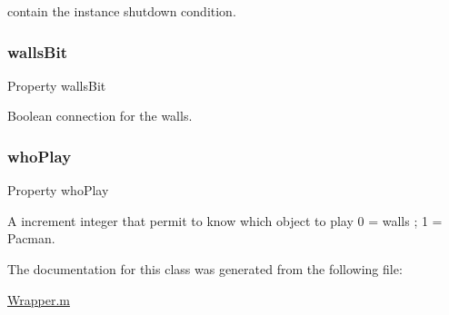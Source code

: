 contain the instance shutdown condition. 

\mbox{\label{class_wrapper_a94dd71be012b98d496117309a20939b1}} 
\subsubsection{\texorpdfstring{walls\+Bit}{wallsBit}}
{\footnotesize\ttfamily Property walls\+Bit}



Boolean connection for the walls. 

\mbox{\label{class_wrapper_a19e8c1d68257003eba8e5a47c8302113}} 
\subsubsection{\texorpdfstring{who\+Play}{whoPlay}}
{\footnotesize\ttfamily Property who\+Play}



A increment integer that permit to know which object to play 0 = walls ; 1 = Pacman. 



The documentation for this class was generated from the following file\+:\begin{DoxyCompactItemize}
\item 
\hyperlink{_wrapper_8m}{Wrapper.\+m}\end{DoxyCompactItemize}
